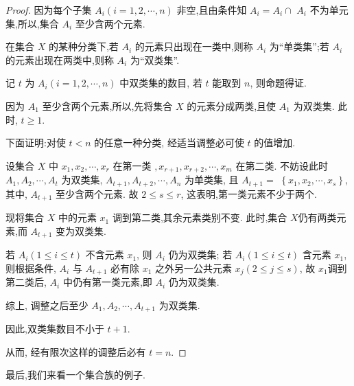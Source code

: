 \begin{proof}
	因为每个子集 $A_{i}(i=1,2, \cdots, n)$ 非空,且由条件知 $A_{i}=A_{i} \cap$ $A_{i}$ 不为单元集,所以,集合 $A_{i}$ 至少含两个元素.

	在集合 $X$ 的某种分类下,若 $A_{i}$ 的元素只出现在一类中,则称 $A_{i}$ 为“单类集”;若 $A_{i}$ 的元素出现在两类中,则称 $A_{i}$ 为“双类集”.

	记 $t$ 为 $A_{i}(i=1,2, \cdots, n)$ 中双类集的数目, 若 $t$ 能取到 $n$, 则命题得证.

	因为 $A_{1}$ 至少含两个元素,所以,先将集合 $X$ 的元素分成两类,且使 $A_{1}$ 为双类集. 此时, $t \geqslant 1$.

	下面证明:对使 $t<n$ 的任意一种分类, 经适当调整必可使 $t$ 的值增加.

	设集合 $X$ 中 $x_{1}, x_{2}, \cdots, x_{r}$ 在第一类 $, x_{r+1}, x_{r+2}, \cdots, x_{m}$ 在第二类. 不妨设此时 $A_{1}, A_{2}, \cdots, A_{t}$ 为双类集, $A_{t+1}, A_{t+2}, \cdots, A_{n}$ 为单类集, 且 $A_{t+1}=$ $\left\{x_{1}, x_{2}, \cdots, x_{s}\right\}$, 其中, $A_{t+1}$ 至少含两个元素. 故 $2 \leqslant s \leqslant r$, 这表明,第一类元素不少于两个.

	现将集合 $X$ 中的元素 $x_{1}$ 调到第二类,其余元素类别不变. 此时,集合 $X$仍有两类元素,而 $A_{t+1}$ 变为双类集.

	若 $A_{i}(1 \leqslant i \leqslant t)$ 不含元素 $x_{1}$, 则 $A_{i}$ 仍为双类集; 若 $A_{i}(1 \leqslant i \leqslant t)$ 含元素 $x_{1}$, 则根据条件, $A_{i}$ 与 $A_{t+1}$ 必有除 $x_{1}$ 之外另一公共元素 $x_{j}(2 \leqslant j \leqslant s)$, 故 $x_{1}$调到第二类后, $A_{i}$ 中仍有第一类元素,即 $A_{i}$ 仍为双类集.

	综上, 调整之后至少 $A_{1}, A_{2}, \cdots, A_{t+1}$ 为双类集.

	因此,双类集数目不小于 $t+1$.

	从而, 经有限次这样的调整后必有 $t=n$.
\end{proof}
最后,我们来看一个集合族的例子.

